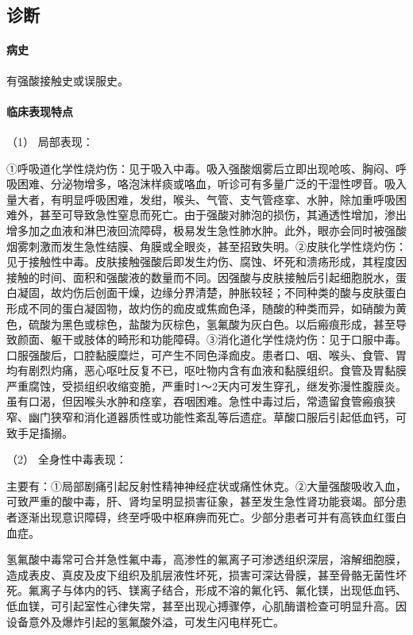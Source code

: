 \subsection{诊断}

\paragraph{病史}

有强酸接触史或误服史。

\paragraph{临床表现特点}

\hypertarget{text00179.htmlux5cux23CHP5-9-1-2-2-1}{}
（1） 局部表现：

①呼吸道化学性烧灼伤：见于吸入中毒。吸入强酸烟雾后立即出现呛咳、胸闷、呼吸困难、分泌物增多，咯泡沫样痰或咯血，听诊可有多量广泛的干湿性啰音。吸入量大者，有明显呼吸困难，发绀，喉头、气管、支气管痉挛、水肿，除加重呼吸困难外，甚至可导致急性窒息而死亡。由于强酸对肺泡的损伤，其通透性增加，渗出增多加之血液和淋巴液回流障碍，极易发生急性肺水肿。此外，眼亦会同时被强酸烟雾刺激而发生急性结膜、角膜或全眼炎，甚至招致失明。②皮肤化学性烧灼伤：见于接触性中毒。皮肤接触强酸后即发生灼伤、腐蚀、坏死和溃疡形成，其程度因接触的时间、面积和强酸液的数量而不同。因强酸与皮肤接触后引起细胞脱水，蛋白凝固，故灼伤后创面干燥，边缘分界清楚，肿胀较轻；不同种类的酸与皮肤蛋白形成不同的蛋白凝固物，故灼伤的痂皮或焦痂色泽，随酸的种类而异，如硝酸为黄色，硫酸为黑色或棕色，盐酸为灰棕色，氢氟酸为灰白色。以后瘢痕形成，甚至导致颜面、躯干或肢体的畸形和功能障碍。③消化道化学性烧灼伤：见于口服中毒。口服强酸后，口腔黏膜糜烂，可产生不同色泽痂皮。患者口、咽、喉头、食管、胃均有剧烈灼痛，恶心呕吐反复不已，呕吐物内含有血液和黏膜组织。食管及胃黏膜严重腐蚀，受损组织收缩变脆，严重时1～2天内可发生穿孔，继发弥漫性腹膜炎。虽有口渴，但因喉头水肿和痉挛，吞咽困难。急性中毒过后，常遗留食管瘢痕狭窄、幽门狭窄和消化道器质性或功能性紊乱等后遗症。草酸口服后引起低血钙，可致手足搐搦。

\hypertarget{text00179.htmlux5cux23CHP5-9-1-2-2-2}{}
（2） 全身性中毒表现：

主要有：①局部剧痛引起反射性精神神经症状或痛性休克。②大量强酸吸收入血，可致严重的酸中毒，肝、肾均呈明显损害征象，甚至发生急性肾功能衰竭。部分患者逐渐出现意识障碍，终至呼吸中枢麻痹而死亡。少部分患者可并有高铁血红蛋白血症。

氢氟酸中毒常可合并急性氟中毒，高渗性的氟离子可渗透组织深层，溶解细胞膜，造成表皮、真皮及皮下组织及肌层液性坏死，损害可深达骨膜，甚至骨骼无菌性坏死。氟离子与体内的钙、镁离子结合，形成不溶的氟化钙、氟化镁，出现低血钙、低血镁，可引起室性心律失常，甚至出现心搏骤停，心肌酶谱检查可明显升高。因设备意外及爆炸引起的氢氟酸外溢，可发生闪电样死亡。


